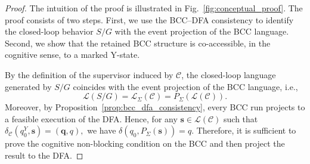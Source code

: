 \documentclass[journal,twoside,web]{ieeecolor}
\begin{document}
\begin{proof}
The intuition of the proof is illustrated in Fig.~\ref{fig:conceptual_proof}. The proof consists of two steps.
First, we use the BCC--DFA consistency to identify the closed-loop behavior $S/G$ with the event projection of the BCC language.
Second, we show that the retained BCC structure is co-accessible, in the cognitive sense, to a marked Y-state.

By the definition of the supervisor induced by $\mathcal{C}$, the closed-loop language generated by $S / G$ coincides with the event projection of the
BCC language, i.e.,
\begin{equation}\label{eq:proof_cnb_lang_equiv}
    \mathcal{L}(S/G) = \mathcal{L}_{\Sigma}(\mathcal C)
                     = P_{\Sigma}(\mathcal{L}(\mathcal C)).
\end{equation}
Moreover, by Proposition~\ref{prop:bcc_dfa_consistency}, every BCC run projects to a feasible execution of the DFA. Hence, for any $\bm{s} \in \mathcal{L}(\mathcal C)$ such that
$
    \delta_{\mathcal{C}}(q^Y_0, \bm{s}) = (\bm{q}, q),
$
we have
$
    \delta(q_0, P_\Sigma(\bm{s})) = q.
$
Therefore, it is sufficient to prove the cognitive non-blocking condition on the BCC and then project the result to the DFA.


\end{proof}
\end{document}
